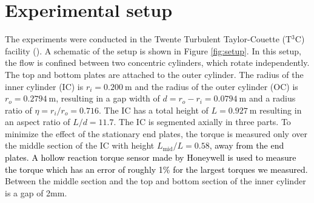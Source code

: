 \documentclass{jfm}
\newcommand{\red}[1]{\textcolor{black}{#1}}
\begin{document}
\section{Experimental setup}\label{sec:experimentalSetup}
The experiments were conducted in the Twente Turbulent Taylor-Couette
(T${}^3$C) facility (\cite{vanGils2011}). A schematic of the setup is shown in
Figure \ref{fig:setup}. In this setup, the flow is confined between two
concentric cylinders, which rotate independently. The top and bottom plates
are attached to the outer cylinder. The radius of the inner cylinder (IC) is
$r_i = \SI{0.200}{\metre}$ and the radius of the outer cylinder (OC) is $r_o =
\SI{0.2794}{\metre}$, resulting in a gap width of $d = r_o - r_i =
\SI{0.0794}{\metre}$ and a radius ratio of $\eta = r_i/r_o = 0.716$. The IC
has a total height of $L = \SI{0.927}{\metre}$ resulting in an aspect ratio of
$L / d = 11.7$. The IC is segmented axially in three parts. To minimize the
effect of the stationary end plates, the torque is measured only over the
middle section of the IC with height $L_{\text{mid}}/L = 0.58$\red{, away from
the end plates. A hollow reaction torque sensor made by Honeywell is used to
measure the torque which has an error of roughly 1\% for the largest torques
we measured.} Between the middle section and the top and bottom section of the
inner cylinder is a gap of 2mm.
\end{document}
